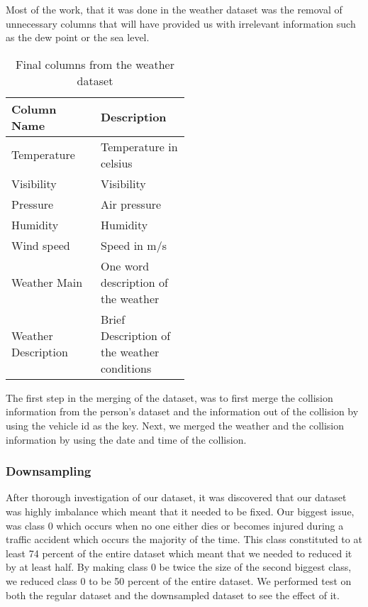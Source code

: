 \documentclass[conference]{IEEEtran}
\begin{document}
		Most of the work, that it was done in the weather dataset was the removal of unnecessary columns that will have provided us with irrelevant information such as the dew point or the sea level.
		\begin{table}[H]
			\centering
			\begin{tabular}{|l|p{0.5\linewidth}|}
				\hline
				\textbf{Column Name} & \textbf{Description}                        \\ \hline
				Temperature          & Temperature in celsius                      \\ \hline
				Visibility           & Visibility                                  \\ \hline
				Pressure             & Air pressure                                \\ \hline
				Humidity             & Humidity                                    \\ \hline
				Wind speed           & Speed in m/s                                \\ \hline
				Weather Main         & One word description of the weather         \\ \hline
				Weather Description  & Brief Description of the weather conditions \\ \hline
			\end{tabular}
			\caption{Final columns from the weather dataset}
		\end{table}
		The first step in the merging of the dataset, was to first merge the collision information from the person's dataset and the information out of the collision by using the vehicle id as the key. Next, we merged the weather and the collision information by using the date and time of the collision.
		\subsubsection{Downsampling}
			After thorough investigation of our dataset, it was discovered that our dataset was highly imbalance which meant that it needed to be fixed. Our biggest issue, was class 0 which occurs when no one either dies or becomes injured during a traffic accident which occurs the majority of the time. This class constituted to at least 74 percent of the entire dataset which meant that we needed to reduced it by at least half. By making class 0 be twice the size of the second biggest class, we reduced class 0 to be 50 percent of the entire dataset. We performed test on both the regular dataset and the downsampled dataset to see the effect of it.
\end{document}
